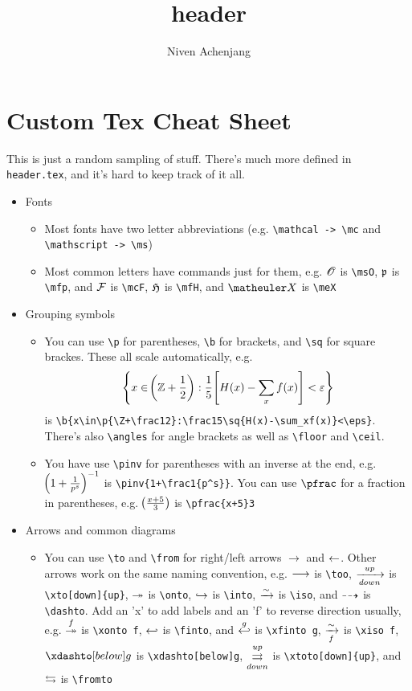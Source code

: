 \documentclass{article}
\title{header}
\author{Niven Achenjang}
\numberwithin{thm}{section}
\numberwithin{prob}{section}
\numberwithin{equation}{section}
\begin{document}
\tableofcontents

\section{Custom Tex Cheat Sheet}
This is just a random sampling of stuff. There's much more defined in \texttt{header.tex}, and it's hard to keep track of it all.
\begin{itemize}
    \item Fonts
    \begin{itemize}
        \item Most fonts have two letter abbreviations (e.g. \verb+\mathcal -> \mc+ and \verb+\mathscript -> \ms+)
        \item Most common letters have commands just for them, e.g. $\msO$ is \verb+\msO+, $\mfp$ is \verb+\mfp+, and $\mcF$ is \verb+\mcF+, $\mfH$ is \verb+\mfH+, and $\meX$ is \verb+\meX+
    \end{itemize}
    \item Grouping symbols
    \begin{itemize}
        \item You can use \verb+\p+ for parentheses, \verb+\b+ for brackets, and \verb+\sq+ for square brackes. These all scale automatically, e.g.
        $$\b{x\in\p{\Z+\frac12}:\frac15\sq{H(x)-\sum_xf(x)}<\eps}$$
        is \verb|\b{x\in\p{\Z+\frac12}:\frac15\sq{H(x)-\sum_xf(x)}<\eps}|. There's also \verb+\angles+ for angle brackets as well as \verb+\floor+ and \verb+\ceil+.
        \item You have use \verb+\pinv+ for parentheses with an inverse at the end, e.g. $\pinv{1+\frac1{p^s}}$ is \verb|\pinv{1+\frac1{p^s}}|. You can use $\verb+\pfrac+$ for a fraction in parentheses, e.g. $\pfrac{x+5}3$ is \verb|\pfrac{x+5}3|
    \end{itemize}
    \item Arrows and common diagrams
    \begin{itemize}
        \item You can use \verb+\to+ and \verb+\from+ for right/left arrows $\to$ and $\from$. Other arrows work on the same naming convention, e.g. $\too$ is \verb+\too+, $\xto[down]{up}$ is \verb+\xto[down]{up}+, $\onto$ is \verb+\onto+, $\into$ is \verb+\into+, $\iso$ is \verb+\iso+, and $\dashto$ is \verb+\dashto+. Add an 'x' to add labels and an 'f' to reverse direction usually, e.g. $\xonto f$ is \verb+\xonto f+, $\finto$ is \verb+\finto+, and $\xfinto g$ is \verb+\xfinto g+, $\xiso f$ is \verb+\xiso f+, $\xdashto[below]g$ is \verb+\xdashto[below]g+, $\xtoto[down]{up}$ is \verb+\xtoto[down]{up}+, and $\fromto$ is \verb+\fromto+

\end{itemize}
\end{itemize}
\end{document}
